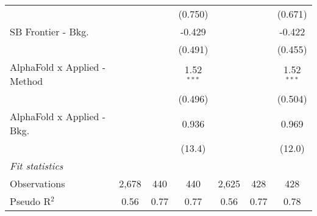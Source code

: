 \begin{tabular}{lcccccc}
                                &               &                & (0.750)        &               &                & (0.671)\\   
   SB Frontier - Bkg.           &               &                & -0.429         &               &                & -0.422\\   
                                &               &                & (0.491)        &               &                & (0.455)\\   
   AlphaFold x Applied - Method &               &                & 1.52$^{***}$   &               &                & 1.52$^{***}$\\   
                                &               &                & (0.496)        &               &                & (0.504)\\   
   AlphaFold x Applied - Bkg.   &               &                & 0.936          &               &                & 0.969\\   
                                &               &                & (13.4)         &               &                & (12.0)\\   
   \midrule
   \emph{Fit statistics}\\
   Observations                 & 2,678         & 440            & 440            & 2,625         & 428            & 428\\  
   Pseudo R$^2$                 & 0.56          & 0.77           & 0.77           & 0.56          & 0.77           & 0.78\\  
   

\end{tabular}
